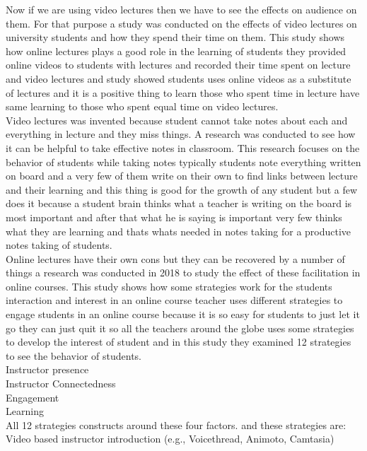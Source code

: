 Now if we are using video lectures then we have to see the effects on audience on them. For that purpose a study was conducted on the effects of video lectures on university students and how they spend their time on them. This study shows how online lectures plays a good role in the learning of students they provided online videos to students with lectures and recorded their time spent on lecture and video lectures and study showed students uses online videos as a substitute of lectures and it is a positive thing to learn those who spent time in lecture have same learning to those who spent equal time on video lectures.\cite{Meehan2019}\\
Video lectures was invented because student cannot take notes about each and everything in lecture and they miss things. A research was conducted to see how it can be helpful to take effective notes in classroom. This research focuses on the behavior of students while taking notes typically students note everything written on board and a very few of them write on their own to find links between lecture and their learning and this thing is good for the growth of any student but a few does it because a student brain thinks what a teacher is writing on the board is most important and after that what he is saying is important very few thinks what they are learning and thats whats needed in notes taking for a productive notes taking of students.\cite{Iannone2019}\\
Online lectures have their own cons but they can be recovered by a number of things a research was conducted in 2018 to study the effect of these facilitation in online courses. This study shows how some strategies work for the students interaction and interest in an online course teacher uses different strategies to engage students in an online course because it is so easy for students to just let it go they can just quit it so all the teachers around the globe uses some strategies to develop the interest of student and in this study they examined 12 strategies to see the behavior of students.\\
Instructor presence\\
Instructor Connectedness\\
Engagement \\
Learning\\
All 12 strategies constructs around these four factors. and these strategies are:\\
Video based instructor introduction (e.g., Voicethread, Animoto, Camtasia)\\
